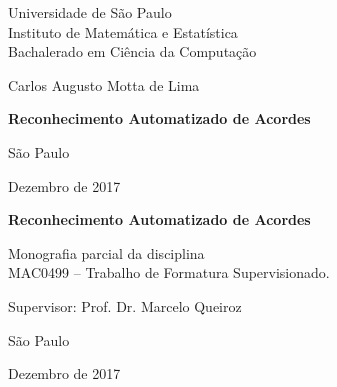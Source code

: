 \documentclass[12pt,twoside,a4paper]{book}
\begin{document}
\frontmatter 
\fancyhead[RO]{{\footnotesize\rightmark}\hspace{2em}\thepage}
\setcounter{tocdepth}{2}
\fancyhead[LE]{\thepage\hspace{2em}\footnotesize{\leftmark}}
\fancyhead[RE,LO]{}
\fancyhead[RO]{{\footnotesize\rightmark}\hspace{2em}\thepage}

\onehalfspacing  %

\thispagestyle{empty}
\begin{center}
    \vspace*{2.3cm}
    Universidade de São Paulo\\
    Instituto de Matemática e Estatística\\
    Bachalerado em Ciência da Computação


    \vspace*{3cm}
    \Large{Carlos Augusto Motta de Lima}
    

    \vspace{3cm}
    \textbf{\Large{Reconhecimento Automatizado de Acordes}}
    
       
    \vskip 5cm
    \normalsize{São Paulo}

    \normalsize{Dezembro de 2017}
\end{center}

%
\newpage
\thispagestyle{empty}
    \begin{center}
        \vspace*{2.3 cm}
        \textbf{\Large{Reconhecimento Automatizado de Acordes}}
        \vspace*{2 cm}
    \end{center}

    \vskip 2cm

    \begin{flushright}
	Monografia parcial da disciplina \\
        MAC0499 -- Trabalho de Formatura Supervisionado.
    \end{flushright}

    \vskip 5cm

    \begin{center}
    Supervisor: Prof. Dr. Marcelo Queiroz

    \vskip 5cm
    \normalsize{São Paulo}

    \normalsize{Dezembro de 2017}
    \end{center}
\pagebreak
\end{document}
